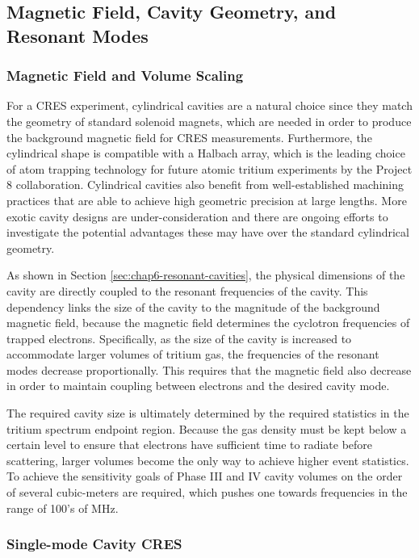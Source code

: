 \subsection{Magnetic Field, Cavity Geometry, and Resonant Modes}

\subsubsection*{Magnetic Field and Volume Scaling}

For a CRES experiment, cylindrical cavities are a natural choice since they match the geometry of standard solenoid magnets, which are needed in order to produce the background magnetic field for CRES measurements. Furthermore, the cylindrical shape is compatible with a Halbach array, which is the leading choice of atom trapping technology for future atomic tritium experiments by the Project 8 collaboration. Cylindrical cavities also benefit from well-established machining practices that are able to achieve high geometric precision at large lengths. More exotic cavity designs are under-consideration and there are ongoing efforts to investigate the potential advantages these may have over the standard cylindrical geometry.

As shown in Section \ref{sec:chap6-resonant-cavities}, the physical dimensions of the cavity are directly coupled to the resonant frequencies of the cavity. This dependency links the size of the cavity to the magnitude of the background magnetic field, because the magnetic field determines the cyclotron frequencies of trapped electrons. Specifically, as the size of the cavity is increased to accommodate larger volumes of tritium gas, the frequencies of the resonant modes decrease proportionally. This requires that the magnetic field also decrease in order to maintain coupling between electrons and the desired cavity mode. 

The required cavity size is ultimately determined by the required statistics in the tritium spectrum endpoint region. Because the gas density must be kept below a certain level to ensure that electrons have sufficient time to radiate before scattering, larger volumes become the only way to achieve higher event statistics. To achieve the sensitivity goals of Phase III and IV cavity volumes on the order of several cubic-meters are required, which pushes one towards frequencies in the range of 100's of MHz.

\subsubsection*{Single-mode Cavity CRES}

